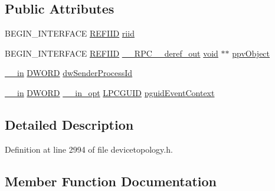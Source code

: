 \subsection*{Public Attributes}
\begin{DoxyCompactItemize}
\item 
B\+E\+G\+I\+N\+\_\+\+I\+N\+T\+E\+R\+F\+A\+CE \hyperlink{px__win__ds_8c_a80ec49c8ae61e234197d5071d2df497d}{R\+E\+F\+I\+ID} \hyperlink{struct_i_control_change_notify_vtbl_a22dd95409feac7775717b97ad63a6cb1}{riid}
\item 
B\+E\+G\+I\+N\+\_\+\+I\+N\+T\+E\+R\+F\+A\+CE \hyperlink{px__win__ds_8c_a80ec49c8ae61e234197d5071d2df497d}{R\+E\+F\+I\+ID} \hyperlink{rpcsal_8h_a23bc188526f10656f9c79d950f6c3192}{\+\_\+\+\_\+\+R\+P\+C\+\_\+\+\_\+deref\+\_\+out} \hyperlink{sound_8c_ae35f5844602719cf66324f4de2a658b3}{void} $\ast$$\ast$ \hyperlink{struct_i_control_change_notify_vtbl_a69c4e0f9d8299aa987902e8de476011a}{ppv\+Object}
\item 
\hyperlink{sal_8h_a3f6b8655e1aa9dfc15a9029f0343009e}{\+\_\+\+\_\+in} \hyperlink{mapinls_8h_ad342ac907eb044443153a22f964bf0af}{D\+W\+O\+RD} \hyperlink{struct_i_control_change_notify_vtbl_aa88f184518c23e75b9a66e5c71b764dc}{dw\+Sender\+Process\+Id}
\item 
\hyperlink{sal_8h_a3f6b8655e1aa9dfc15a9029f0343009e}{\+\_\+\+\_\+in} \hyperlink{mapinls_8h_ad342ac907eb044443153a22f964bf0af}{D\+W\+O\+RD} \hyperlink{sal_8h_a9c2d0f2980e51b51bb405ee2a31a3353}{\+\_\+\+\_\+in\+\_\+opt} \hyperlink{pa__win__wasapi_8c_a9c061ab1f26db8746b3dab38991f48a0}{L\+P\+C\+G\+U\+ID} \hyperlink{struct_i_control_change_notify_vtbl_a05d38cb1428ea5fb49ea619707c17365}{pguid\+Event\+Context}
\end{DoxyCompactItemize}


\subsection{Detailed Description}


Definition at line 2994 of file devicetopology.\+h.



\subsection{Member Function Documentation}
